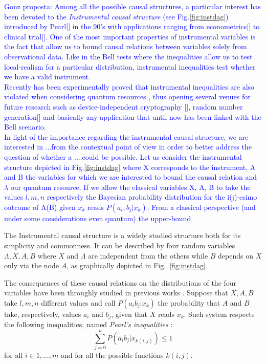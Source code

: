 \documentclass[
    nofootinbin,
    floatfix,
    amsfonts,
    twocolumn, 
    aps, 
    prl]{revtex4-1}
\begin{document}
\textcolor{blue}{Gonz proposta: Among all the possible causal structures, a particular interest has been devoted to the \textit{Instrumental causal structure} (see Fig.\ref{fig:instdag}) introduced by Pearl[] in the 90's with applications ranging from econometrics[] to clinical trial[]. One of the most important properties of instrumental variables is the fact that allow us to bound causal relations between variables solely from observational data. Like in the Bell tests where the inequalities allow us to test local-realism for a particular distribution, instrumental inequalities test whether we have a valid instrument.}\\
\textcolor{blue}{Recently has been experimentally proved that instrumental inequalities are also violated when considering quantum resources \cite{chaves2018}, thus opening several venues for future research such as device-independent cryptography [], random number generation[] and basically any application that until now has been linked with the Bell scenario.}\\

\textcolor{blue}{In light of the importance regarding the instrumental causal structure, we are interested in ...from the contextual point of view in order to better address the question of whether a ....could be possible.
Let us consider the instrumental structure depicted in Fig.\ref{fig:instdag} where X corresponds to the instrument, A and B the variables for which we are interested to bound the causal relation and $\lambda$ our quantum resource. If we allow the classical variables X, A, B to take the values $l,m,n$ respectively the Bayesian probability distribution for the i(j)-esimo outcome of A(B) given $x_k$ reads $P(a_i,b_j|x_k)$. From a classical perspective (and under some considerations even quantum) the upper-bound}


The Instrumental causal structure is a widely studied
structure both for its simplicity and commonness.
It can be described by four random variables $\Lambda, X, A, B$ where $X$ and
$\Lambda$ are independent from the others while $B$ depends on $X$ only via the node $A$,
as graphically depicted in Fig.~\ref{fig:instdag}.

The consequences of these causal relations on the distributions of the four
variables have been throughly studied in previous works \cite{pearl1995,
bonet2001}.
Suppose that $X, A, B$ take $l,m,n$ different values and 
call $P(a_i b_j | x_k)$ the probability that $A$ and $B$ take, respectively, values $a_i$
and $b_j$, given that $X$ reads $x_k$.
Such system respects the following inequalities,
named \emph{Pearl's inequalities} \cite{pearl1995}:
\begin{equation} 
    \sum_{j=0}^{n} P(a_i b_j|x_{k(i,j)}) \le 1
    \label{eq:pearl_ineq}
\end{equation}
for all $i \in {1,\ldots, m}$ and for all the possible functions $k(i,j)$.
\end{document}

